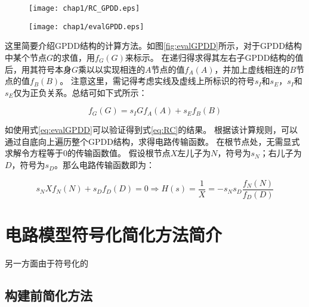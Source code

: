 \begin{exmp}
\begin{figure}[!htp]
	\centering
	\texttt{[image: chap1/RC\_GPDD.eps]}
\end{figure}

\begin{figure}[!htp]
	\centering
	\texttt{[image: chap1/evalGPDD.eps]}
\end{figure}

这里简要介绍GPDD结构的计算方法。如图\ref{fig:evalGPDD}所示，对于GPDD结构中某个节点$G$的求值，用$f_{G} \left( G \right)$来标示。
在递归得求得其左右子GPDD结构的值后，用其符号本身$G$乘以以实现相连的$A$节点的值$f_{A} \left( A \right)$，并加上虚线相连的$B$节点的值$f_{B} \left( B \right)$。
注意这里，需记得考虑实线及虚线上所标识的符号$s_I$和$s_E$，$s_I$和$s_E$仅为正负关系。总结可如下式所示：

\begin{equation}
\label{eq:evalGPDD}
f_{G} \left( G \right) = s_I G f_{A} \left( A \right) + s_E f_{B} \left( B \right)
\end{equation}

如使用式\ref{eq:evalGPDD}可以验证得到式\ref{eq:RC}的结果。
根据该计算规则，可以通过自底向上遍历整个GPDD结构，求得电路传输函数。
在根节点处，无需显式求解令方程等于0的传输函数值。
假设根节点$X$左儿子为$N$，符号为$s_N$；右儿子为$D$，符号为$s_D$。那么电路传输函数即为：

\begin{equation}
\label{eq:evalGPDDRoot}
s_N  X f_N\left(N\right) + s_D f_D\left(D\right) = 0 \Rightarrow H \left( s \right) = \frac{1}{X}= - s_N s_D \frac{f_N\left(N\right)}{f_D\left(D\right)}
\end{equation}

\end{exmp}

\section{电路模型符号化简化方法简介}
\label{sec:intro:simp}

另一方面由于符号化的

\subsection{构建前简化方法}
\label{subsec:intro:simp:SBG}
\parencite{Hsu-SBG-1994}
